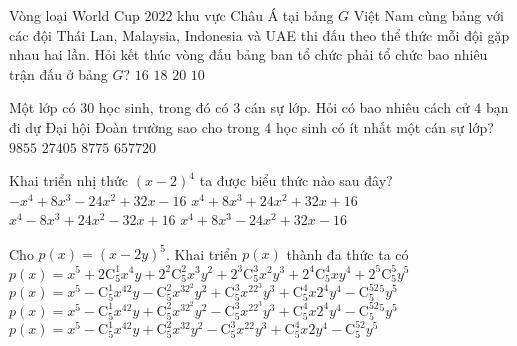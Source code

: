 \begin{ex}%
	Vòng loại World Cup $2022$ khu vực Châu Á tại bảng $G$ Việt Nam cùng bảng với các đội Thái Lan, Malaysia, Indonesia và UAE thi đấu theo thể thức mỗi đội gặp nhau hai lần. Hỏi kết thúc vòng đấu bảng ban tổ chức phải tổ chức bao nhiêu trận đấu ở bảng $G$?
	\choice
	{$16$}
	{$18$}
	{\True $20$}
	{$10$}
\end{ex}
\begin{ex}%
	Một lớp có $30$ học sinh, trong đó có $3$ cán sự lớp. Hỏi có bao nhiêu cách cử $4$ bạn đi dự Đại hội Đoàn trường sao cho trong $4$ học sinh có ít nhất một cán sự lớp?
	\choice
	{\True $9855$}
	{$27405$}
	{$8775$}
	{$657720$}
\end{ex}
\begin{ex}%
	Khai triển nhị thức $(x-2)^4$ ta được biểu thức nào sau đây?
	\choice
	{$-x^4+8x^3-24x^2+32x-16$}
	{$x^4+8x^3+24x^2+32x+16$}
	{\True $x^4-8x^3+24x^2-32x+16$}
	{$x^4+8x^3-24x^2+32x-16$}
\end{ex}

\begin{ex}%
	Cho $p(x)=(x-2y)^5$. Khai triển $p(x)$ thành đa thức ta có
	\choice
	{$p(x)=x^5+2\mathrm{C}_5^1x^4y+2^2\mathrm{C}_5^2x^3y^2+2^3\mathrm{C}_5^3x^2y^3+2^4\mathrm{C}_5^4xy^4+2^5\mathrm{C}_5^5y^5$}
	{$p(x)=x^5-\mathrm{C}_5^1x^42y-\mathrm{C}_5^2x^32^2y^2+\mathrm{C}_5^3x^22^3y^3+\mathrm{C}_5^4x2^4y^4-\mathrm{C}_5^52^5y^5$}
	{\True $p(x)=x^5-\mathrm{C}_5^1x^42y+\mathrm{C}_5^2x^32^2y^2-\mathrm{C}_5^3x^22^3y^3+\mathrm{C}_5^4x2^4y^4-\mathrm{C}_5^52^5y^5$}
	{$p(x)=x^5-\mathrm{C}_5^1x^42y+\mathrm{C}_5^2x^32y^2-\mathrm{C}_5^3x^22y^3+\mathrm{C}_5^4x2y^4-\mathrm{C}_5^52y^5$}
\end{ex}



